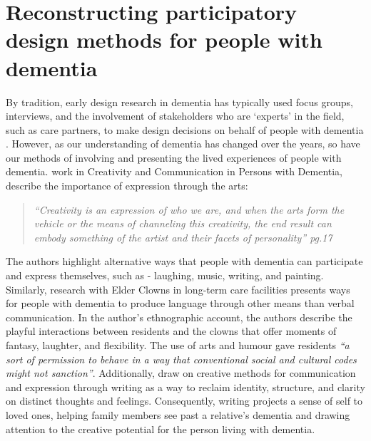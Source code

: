 \section{Reconstructing participatory design methods for people with dementia}
\label{method:DementiaPD}
By tradition, early design research in dementia has typically used focus groups, interviews, and the involvement of stakeholders who are `experts’ in the field, such as care partners, to make design decisions on behalf of people with dementia \citep{branco_personalised_2017}. However, as our understanding of dementia has changed over the years, so have our methods of involving and presenting the lived experiences of people with dementia. \cite{john_killick_claire_craig_creativity_2012} work in Creativity and Communication in Persons with Dementia, describe the importance of expression through the arts: 

\begin{quote}\textit{``Creativity is an expression of who we are, and when the arts form the vehicle or the means of channeling this creativity, the end result can embody something of the artist and their facets of personality'' \cite{john_killick_claire_craig_creativity_2012} pg.17}
\end{quote}

The authors highlight alternative ways that people with dementia can participate and express themselves, such as - laughing, music, writing, and painting. Similarly, \cite{kontos_presence_2015} research with Elder Clowns in long-term care facilities presents ways for people with dementia to produce language through other means than verbal communication. In the author's ethnographic account, the authors describe the playful interactions between residents and the clowns that offer moments of fantasy, laughter, and flexibility. The use of arts and humour gave residents \textit{``a sort of permission to behave in a way that conventional social and cultural codes might not sanction''}. Additionally, \cite{ryan_dementia_2009} draw on creative methods for communication and expression through writing as a way to reclaim identity, structure, and clarity on distinct thoughts and feelings. Consequently, writing projects a sense of self to loved ones, helping family members see past a relative's dementia and drawing attention to the creative potential for the person living with dementia. 

